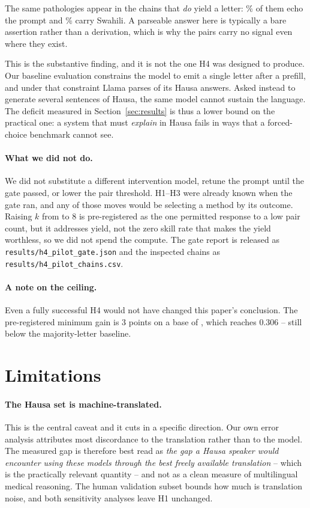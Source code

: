 \documentclass[11pt,a4paper]{article}
\begin{document}
The same pathologies appear in the chains that \emph{do} yield a letter:
\FailParsedPromptEcho{}\% of them echo the prompt and
\FailParsedCodeSwitch{}\% carry Swahili. A parseable answer here is typically a
bare assertion rather than a derivation, which is why the pairs carry no signal
even where they exist.

This is the substantive finding, and it is not the one H4 was designed to
produce. Our baseline evaluation constrains the model to emit a single letter
after a prefill, and under that constraint Llama parses \ParseHaLlama{} of its
Hausa answers. Asked instead to generate several sentences of Hausa, the same
model cannot sustain the language. The deficit measured in
Section~\ref{sec:results} is thus a lower bound on the practical one: a system
that must \emph{explain} in Hausa fails in ways that a forced-choice benchmark
cannot see.

\paragraph{What we did not do.}
We did not substitute a different intervention model, retune the prompt until
the gate passed, or lower the pair threshold. H1--H3 were already known when
the gate ran, and any of those moves would be selecting a method by its
outcome. Raising $k$ from \GateK{} to 8 is pre-registered as the one permitted
response to a low pair count, but it addresses yield, not the zero skill rate
that makes the yield worthless, so we did not spend the compute. The gate
report is released as \texttt{results/h4\_pilot\_gate.json} and the inspected
chains as \texttt{results/h4\_pilot\_chains.csv}.

\paragraph{A note on the ceiling.}
Even a fully successful H4 would not have changed this paper's conclusion. The
pre-registered minimum gain is 3 points on a base of \HaLlama{}, which reaches
0.306 -- still below the \BaselineP{} majority-letter baseline.

\section{Limitations}

\paragraph{The Hausa set is machine-translated.}
This is the central caveat and it cuts in a specific direction. Our own error
analysis attributes most discordance to the translation rather than to the
model. The measured gap is therefore best read as \emph{the gap a Hausa speaker
would encounter using these models through the best freely available
translation} -- which is the practically relevant quantity -- and not as a clean
measure of multilingual medical reasoning. The human validation subset bounds how
much is translation noise, and both sensitivity analyses leave H1 unchanged.
\end{document}
